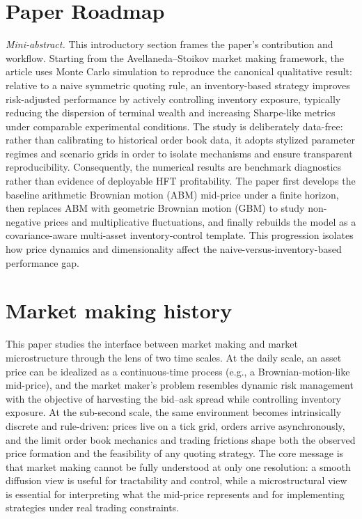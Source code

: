 \documentclass[a4paper,10pt,titlepage,oneside,openany]{book}
\theoremstyle{plain}\newtheorem{theorem}{Theorem}[chapter]
\theoremstyle{definition}\newtheorem{definition}{Definition}[chapter]
\theoremstyle{remark}\newtheorem{remark}{Remark}[chapter]
\newcommand{\miniabstract}[1]{%
\vspace{-2pt}
\begin{tcolorbox}[colback=gray!6,colframe=black!15,boxrule=0.3pt,arc=3pt,left=6pt,right=6pt,top=4pt,bottom=4pt]
\textit{Mini-abstract.} #1
\end{tcolorbox}
\vspace{-4pt}
}
\begin{document}
\section*{Paper Roadmap}
\miniabstract{This introductory section frames the paper's contribution and workflow. Starting from the Avellaneda--Stoikov market making framework, the article uses Monte Carlo simulation to reproduce the canonical qualitative result: relative to a naive symmetric quoting rule, an inventory-based strategy improves risk-adjusted performance by actively controlling inventory exposure, typically reducing the dispersion of terminal wealth and increasing Sharpe-like metrics under comparable experimental conditions. The study is deliberately data-free: rather than calibrating to historical order book data, it adopts stylized parameter regimes and scenario grids in order to isolate mechanisms and ensure transparent reproducibility. Consequently, the numerical results are benchmark diagnostics rather than evidence of deployable HFT profitability. The paper first develops the baseline arithmetic Brownian motion (ABM) mid-price under a finite horizon, then replaces ABM with geometric Brownian motion (GBM) to study non-negative prices and multiplicative fluctuations, and finally rebuilds the model as a covariance-aware multi-asset inventory-control template. This progression isolates how price dynamics and dimensionality affect the naive-versus-inventory-based performance gap.}

\section*{Market making history}
This paper studies the interface between market making and market microstructure through the lens of two time scales. At the daily scale, an asset price can be idealized as a continuous-time process (e.g., a Brownian-motion-like mid-price), and the market maker's problem resembles dynamic risk management with the objective of harvesting the bid--ask spread while controlling inventory exposure. At the sub-second scale, the same environment becomes intrinsically discrete and rule-driven: prices live on a tick grid, orders arrive asynchronously, and the limit order book mechanics and trading frictions shape both the observed price formation and the feasibility of any quoting strategy. The core message is that market making cannot be fully understood at only one resolution: a smooth diffusion view is useful for tractability and control, while a microstructural view is essential for interpreting what the mid-price represents and for implementing strategies under real trading constraints.
\end{document}
